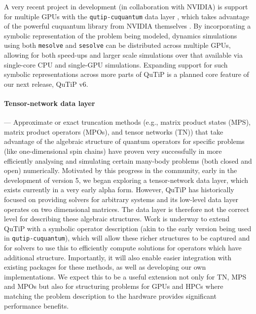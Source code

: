 \documentclass[preprint,3p,sort&compress]{elsarticle}
\def\code#1{\texttt{#1}}
\begin{document}
A very recent project in development (in collaboration with NVIDIA) is support for multiple GPUs with the \code{qutip-cuquantum} data layer \cite{qutip-cuquantum}, which takes advantage of the powerful cuquantum library from NVIDIA themselves \cite{cuquantum}. By incorporating a symbolic representation of the problem being modeled, dynamics simulations using both \code{mesolve} and \code{sesolve} can be distributed across multiple GPUs, allowing for both speed-ups and larger scale simulations over that available via single-core CPU and single-GPU simulations. Expanding support for such symbolic representations across more parts of QuTiP is a planned core feature of our next release, QuTiP v6.

\paragraph{Tensor-network data layer} --- Approximate or exact truncation methods (e.g., matrix product states (MPS), matrix product operators (MPOs), and tensor networks (TN)) that take advantage of the
algebraic structure of quantum operators for specific problems (like one-dimensional spin chains) have proven very successfully in more efficiently analysing and simulating certain many-body problems (both closed and open) numerically.  Motivated by this progress in the community, early in the development of version 5, we began exploring a tensor-network data layer, which exists currently in a very early alpha form.  However, QuTiP has historically focused on providing solvers for arbitrary systems and its low-level data
layer operates on two dimensional matrices. The data layer is therefore not the correct level for describing these algebraic structures. Work is underway to extend QuTiP with a symbolic operator
description (akin to the early version being used in \code{qutip-cuquantum}), which will allow these richer structures to be captured
and for solvers to use this to efficiently compute solutions for
operators which have additional structure. Importantly, it will also enable easier integration
with existing packages for these methods, as well as developing our own implementations. We expect this to be a
useful extension not only for TN, MPS and MPOs but also for
structuring problems for GPUs and HPCs where matching the problem
description to the hardware provides significant performance benefits.
\end{document}

